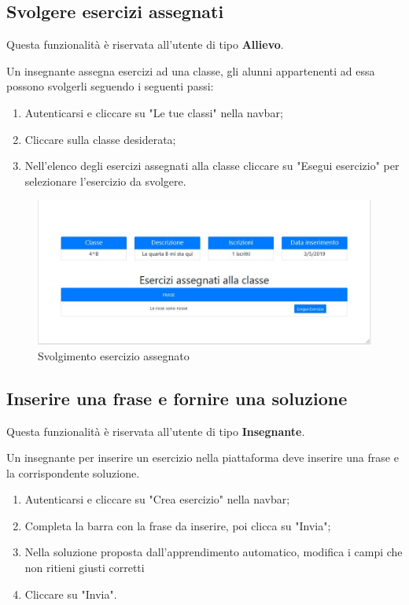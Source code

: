 \documentclass[11pt,a4paper]{article}
\begin{document}
{	\newpage
	\subsection{Svolgere esercizi assegnati}
	Questa funzionalità è riservata all'utente di tipo \textbf{Allievo}.
	
	\noindent Un insegnante assegna esercizi ad una classe, gli alunni appartenenti ad essa possono svolgerli seguendo i seguenti passi:
	
	\begin{enumerate}
		\item Autenticarsi e cliccare su "Le tue classi" nella navbar;
		\item Cliccare sulla classe desiderata;
		\item Nell'elenco degli esercizi assegnati alla classe cliccare su "Esegui esercizio" per selezionare l'esercizio da svolgere.
	\end{enumerate}

	\begin{figure}[h]
		\centering
		\includegraphics[scale=0.65]{images/esassegnato.jpg}
		\caption{Svolgimento esercizio assegnato}
	\end{figure}
		
	\newpage
	\subsection{Inserire una frase e fornire una soluzione}
		Questa funzionalità è riservata all'utente di tipo \textbf{Insegnante}.
		
		\noindent Un insegnante per inserire un esercizio nella piattaforma deve inserire una frase e la corrispondente soluzione.
		
		\begin{enumerate}
			\item Autenticarsi e cliccare su "Crea esercizio" nella navbar;
			\item Completa la barra con la frase da inserire, poi clicca su "Invia";
			\item Nella soluzione proposta dall'apprendimento automatico, modifica i campi che non ritieni giusti corretti
			\item Cliccare su "Invia". 
		\end{enumerate}
	
}
\end{document}
